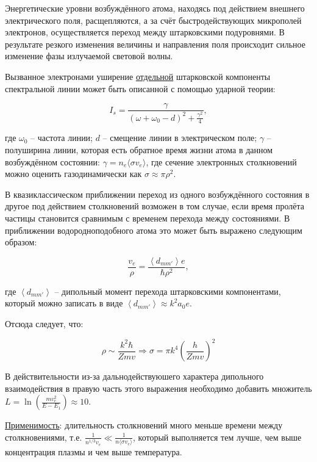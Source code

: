 \documentclass[10pt, a4paper]{article}
\begin{document}
Энергетические уровни возбуждённого атома, находясь под действием внешнего электрического поля, расщепляются, а за счёт быстродействующих микрополей электронов, осуществляется переход между штарковскими подуровнями. В результате резкого изменения величины и направления поля происходит сильное изменение фазы излучаемой световой волны. 

Вызванное электронами уширение \uline{отдельной} штарковской компоненты спектральной линии может быть описанной с помощью ударной теории:

\begin{equation*}
	I_s=\frac{\gamma}{(\omega + \omega_0 - d)^{2}+ \frac{\gamma^{2}}{4}},
\end{equation*}

где $\omega_0$ -- частота линии; $d$ -- смещение линии в электрическом поле; $\gamma$ -- полуширина линии, которая есть обратное время жизни атома в данном возбуждённом состоянии: $\gamma = n_e \langle\sigma v_e\rangle$, где сечение электронных столкновений можно оценить газодинамически как $\sigma\approx\pi\rho^{2}$.

В квазиклассическом приближении переход из одного возбуждённого состояния в другое под действием столкновений возможен в том случае, если время пролёта частицы становится сравнимым с временем перехода между состояниями. В приближении водородноподобного атома это может быть выражено следующим образом:

\begin{equation*}
	\frac{v_e}{\rho}=\frac{\left\langle d_{m m'}\right\rangle e}{\hbar \rho^2},
\end{equation*}

где $\left\langle d_{m m'}\right\rangle $ -- дипольный момент перехода штарковскими компонентами, который можно записать в виде $\left\langle d_{m m'}\right\rangle\approx k^2a_{0}e$.

Отсюда следует, что:

\begin{equation*}
 \rho \sim \frac{k^2 \hbar}{Zmv}\Rightarrow\sigma = \pi k^4 \left(\frac{h}{Zmv}\right)^2
\end{equation*}

В действительности из-за дальнодействуюшего характера дипольного взаимодействия в правую часть этого выражения необходимо добавить множитель $L=\ln(\frac{mv_e^2}{E-E_1})\approx10$.

\uline{Применимость}: длительность столкновений много меньше времени между столкновениями, т.е. $\frac{1}{n^{1/3}v_e} \ll \frac{1}{n \langle\sigma v_e\rangle}$, который выполняется тем лучше, чем выше концентрация плазмы и чем выше температура.
\end{document}
